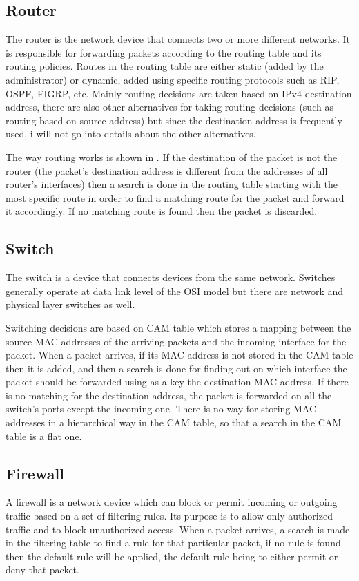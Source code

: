 \subsection{Router}
\label{sub-sec:router}
The router is the network device that connects two or more different networks. It is responsible for 
forwarding packets according to the routing table and its routing policies. Routes in the routing table 
are either static (added by the administrator) or dynamic, added using specific routing protocols such as RIP, OSPF, EIGRP, etc.
Mainly routing decisions are taken based on IPv4 destination address, there are also other alternatives for taking routing 
decisions (such as routing based on source address) but since the destination address is frequently used, 
i will not go into details about the other alternatives. 

The way routing works is shown in .
If the destination of the packet is not the router (the packet's destination address is different from the 
addresses of all router's interfaces) then a search is done in the routing table starting with the most 
specific route in order to find a matching route for the packet and forward it accordingly. If no
matching route is found then the packet is discarded.
\subsection{Switch}
\label{sub-sec:switch}
The switch is a device that connects devices from the same network. Switches generally operate at 
data link level of the OSI model but there are network and physical layer switches as well. 

Switching decisions are based on CAM table which stores a mapping between the source MAC addresses 
of the arriving packets and the incoming interface for the packet. When a packet arrives, if its 
MAC address is not stored in the CAM table then it is added, and then a search is done for finding 
out on which interface the packet should be forwarded using as a key the destination MAC address. If there is no matching for the destination address, the packet is forwarded on all the switch's ports except the incoming one.
There is no way for storing MAC addresses in a hierarchical way in the CAM table, so that a search in 
the CAM table is a flat one.     

\subsection{Firewall}
\label{sub-sec:firewall}
A firewall is a network device which can block or permit incoming or outgoing traffic based on a set 
of filtering rules. Its purpose is to allow only authorized traffic and to block unauthorized access.
When a packet arrives, a search is made in the filtering table to find a rule for that particular packet, 
if no rule is found then the default rule will be applied, the default rule being to either permit or deny 
that packet. 


